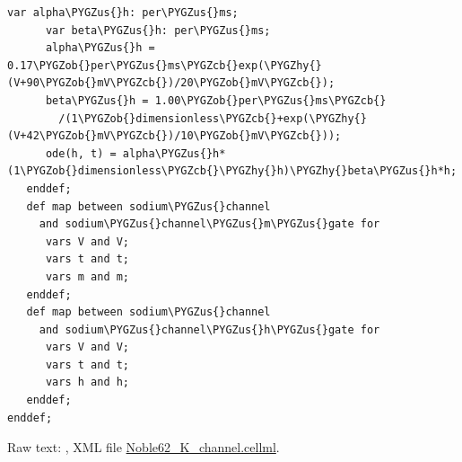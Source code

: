 \documentclass[a4paper,10pt,english]{sphinxmanual}
\def\PYGZus{\char`\_}
\def\PYGZob{\char`\{}
\def\PYGZcb{\char`\}}
\def\PYGZhy{\char`\-}
\begin{document}
\begin{Verbatim}[commandchars=\\\{\}]
      var alpha\PYGZus{}h: per\PYGZus{}ms;
      var beta\PYGZus{}h: per\PYGZus{}ms;
      alpha\PYGZus{}h = 0.17\PYGZob{}per\PYGZus{}ms\PYGZcb{}exp(\PYGZhy{}(V+90\PYGZob{}mV\PYGZcb{})/20\PYGZob{}mV\PYGZcb{});
      beta\PYGZus{}h = 1.00\PYGZob{}per\PYGZus{}ms\PYGZcb{}
        /(1\PYGZob{}dimensionless\PYGZcb{}+exp(\PYGZhy{}(V+42\PYGZob{}mV\PYGZcb{})/10\PYGZob{}mV\PYGZcb{}));
      ode(h, t) = alpha\PYGZus{}h*(1\PYGZob{}dimensionless\PYGZcb{}\PYGZhy{}h)\PYGZhy{}beta\PYGZus{}h*h;
   enddef;
   def map between sodium\PYGZus{}channel
     and sodium\PYGZus{}channel\PYGZus{}m\PYGZus{}gate for
      vars V and V;
      vars t and t;
      vars m and m;
   enddef;
   def map between sodium\PYGZus{}channel
     and sodium\PYGZus{}channel\PYGZus{}h\PYGZus{}gate for
      vars V and V;
      vars t and t;
      vars h and h;
   enddef;
enddef;
\end{Verbatim}

Raw text: , XML file \href{https://models.physiomeproject.org/workspace/25d/rawfile/aec9dd2760d3512135605017226531ac1d4d0d0f/Noble62\_K\_channel.cellml}{Noble62\_K\_channel.cellml}.
\end{document}
